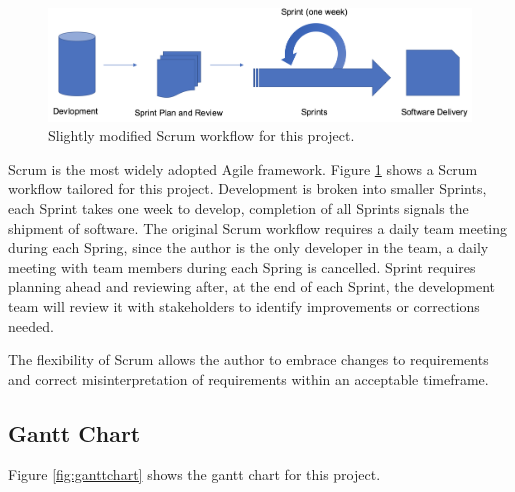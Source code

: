 \documentclass[doc,natbib]{apa6}
\begin{document}
\begin{figure}[H]
	\centering
	\includegraphics[width=\textwidth,keepaspectratio]{figures/fig15.png}
	\caption{\label{fig:15}Slightly modified Scrum workflow for this project. }
\end{figure}

Scrum is the most widely adopted Agile framework. Figure \ref{fig:15} shows a Scrum workflow tailored for this project. Development is broken into smaller Sprints, each Sprint takes one week to develop, completion of all Sprints signals the shipment of software. The original Scrum workflow requires a daily team meeting during each Spring, since the author is the only developer in the team, a daily meeting with team members during each Spring is cancelled. Sprint requires planning ahead and reviewing after, at the end of each Sprint, the development team will review it with stakeholders to identify improvements or corrections needed.

The flexibility of Scrum allows the author to embrace changes to requirements and correct misinterpretation of requirements within an acceptable timeframe.

\subsection{Gantt Chart}
Figure \ref{fig:ganttchart} shows the gantt chart for this project. 
\end{document}
